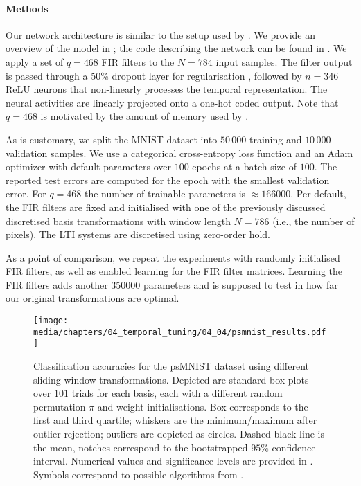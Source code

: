 \paragraph{Methods}
Our network architecture is similar to the setup used by \citet{voelker2019lmu}.
We provide an overview of the model in ; the code describing the network can be found in .
We apply a set of $q = 468$ FIR filters to the $N = 784$ input samples.
The filter output is passed through a 50\% dropout layer for regularisation \citep{hinton2012improving}, followed by $n = 346$ ReLU neurons that non-linearly processes the temporal representation.
The neural activities are linearly projected onto a one-hot coded output.
Note that $q = 468$ is motivated by the amount of memory used by \citet{chandar2019nonsaturating}.

As is customary, we split the MNIST dataset into $50\,000$ training and $10\,000$ validation samples.
We use a categorical cross-entropy loss function and an Adam optimizer \citep{kingma2015adam} with default parameters over $100$ epochs at a batch size of $100$.
The reported test errors are computed for the epoch with the smallest validation error.
For $q = 468$ the number of trainable parameters is $\approx\num{166000}$.
Per default, the FIR filters are fixed and initialised with one of the previously discussed discretised basis transformations with window length $N = 786$ (i.e., the number of pixels).
The LTI systems are discretised using zero-order hold.

As a point of comparison, we repeat the experiments with randomly initialised FIR filters, as well as enabled learning for the FIR filter matrices.
Learning the FIR filters adds another \num{350000} parameters and is supposed to test in how far our original transformations are optimal.

\begin{figure}
\centering
\texttt{[image: media/chapters/04\_temporal\_tuning/04\_04/psmnist\_results.pdf]}
\caption[Classification accuracies for the psMNIST dataset using different sliding-window transformations]{Classification accuracies for the psMNIST dataset using different sliding-window transformations.
Depicted are standard box-plots over $101$ trials for each basis, each with a different random permutation $\pi$ and weight initialisations. Box corresponds to the first and third quartile; whiskers are the minimum/maximum after outlier rejection; outliers are depicted as circles.
Dashed black line is the mean, notches correspond to the bootstrapped $95\%$ confidence interval.
Numerical values and significance levels are provided in .
Symbols correspond to possible algorithms from .
}
\label{fig:psmnist_results}
\end{figure}

